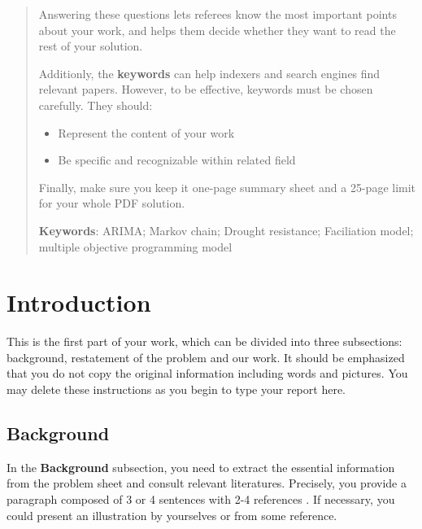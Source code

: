 \documentclass[12pt]{article}  %
\begin{document}
\begin{abstract}
 Answering these questions lets referees know the most important points about your work, and helps them decide whether they want to read the rest of your solution. 
 
 Additionly, the \textbf{keywords} can help indexers and search engines find relevant papers. However, to be effective, keywords must be chosen carefully. They should:
 \begin{itemize}
     \setlength{\parsep}{0ex} %
     \setlength{\topsep}{2ex} %
     \setlength{\itemsep}{1ex} %
     \item Represent the content of your work
     \item Be specific and recognizable within related field 
 \end{itemize}
 
 Finally, make sure you keep it one-page summary sheet and a 25-page limit for your whole PDF solution.
 
     \vspace{5pt}  %
     \textbf{Keywords}: ARIMA; Markov chain; Drought resistance; Faciliation model; multiple objective programming model
 
 \end{abstract}
 
 \maketitle  %
 
 \tableofcontents  %
 
 
 \section{Introduction}
 
 This is the first part of your work, which can be divided into three subsections: background, restatement of the problem and our work. It should be emphasized that you do not copy the original information including words and pictures. You may delete these instructions as you begin to type your report here.
 
 \subsection{Background}
 
 In the \textbf{Background} subsection, you need to extract the essential information from the problem sheet and consult relevant literatures.  Precisely, you provide a paragraph composed of 3 or 4 sentences with 2-4 references \cite{NDZY2021,V2020}. If necessary, you could present an illustration by yourselves or from some reference.  
 
\end{document}
